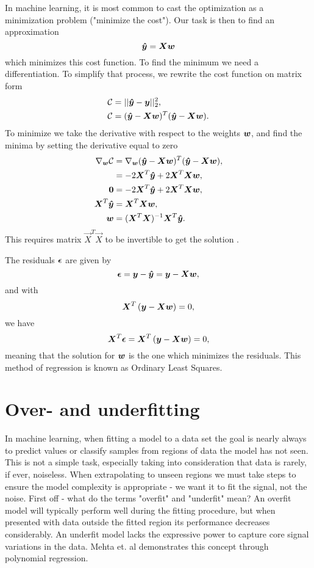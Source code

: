 In machine learning, it is most common to cast the optimization as a minimization problem
("minimize the cost"). Our task is then to find an approximation
\begin{equation}\label{eq:ols-approximation}
	{\boldsymbol{\hat{y}}} = {\boldsymbol{Xw}}
\end{equation}
which minimizes this cost function.
To find the minimum we need a differentiation. To simplify that process, we rewrite the cost function on matrix form
\begin{align*}
\mathcal{C} &= || {\boldsymbol{\hat{y}}} - {\boldsymbol{y}} ||_2 ^2, \\
\mathcal{C} &= ( {\boldsymbol{\hat{y}}} - {\boldsymbol{Xw}})^T( {\boldsymbol{\hat{y}}} - {\boldsymbol{Xw}}).
\end{align*}
To minimize we take the derivative with respect to the weights ${\boldsymbol{w}}$,
and find the minima by setting the derivative equal to zero
\begin{align}
\nabla _{{\boldsymbol{w}}}\mathcal{C} &= \nabla _{{\boldsymbol{w}}} ( {\boldsymbol{\hat{y}}} - {\boldsymbol{Xw}})^T( {\boldsymbol{\hat{y}}} - {\boldsymbol{Xw}}), \\
&= -2{\boldsymbol{X}}^T{\boldsymbol{\hat{y}}} + 2{\boldsymbol{X}}^T{\boldsymbol{X}}{\boldsymbol{w}}, \\
{\boldsymbol{0}} &= -2{\boldsymbol{X}}^T{\boldsymbol{\hat{y}}} + 2{\boldsymbol{X}}^T{\boldsymbol{X}}{\boldsymbol{w}}, \\
{\boldsymbol{X}}^T{\boldsymbol{\hat{y}}} &= {\boldsymbol{X}}^T{\boldsymbol{X}}{\boldsymbol{w}}, \\
{\boldsymbol{w}} &=({\boldsymbol{X}}^T{\boldsymbol{X}})^{-1} {\boldsymbol{X}}^T{\boldsymbol{\hat{y}}}. \label{eq:ols}
\end{align}
This requires matrix \(\vec{X}^T\vec{X}\) to be invertible to get the solution 
\cite{James2000}.

The residuals ${\boldsymbol{\epsilon}}$ are given by
$${\boldsymbol{\epsilon}} = {\boldsymbol{y}}-{\boldsymbol{\hat{y}}} = {\boldsymbol{y}}-{\boldsymbol{X}}{\boldsymbol{w}},$$
and with 
$${\boldsymbol{X}}^T\left( {\boldsymbol{y}}-{\boldsymbol{X}}{\boldsymbol{w}}\right)= 0,$$
we have
$${\boldsymbol{X}}^T{\boldsymbol{\epsilon}}={\boldsymbol{X}}^T\left( {\boldsymbol{y}}-{\boldsymbol{X}}{\boldsymbol{w}}\right)= 0,$$
meaning that the solution for ${\boldsymbol{w}}$ is the one which minimizes the residuals.
This method of regression is known as Ordinary Least Squares.

\section{Over- and underfitting}\label{sec:overfitting}
In machine learning, when fitting a model to a data set the goal is nearly always to predict 
values or classify samples from regions of data the model has not seen. This is not a simple task,
especially taking into consideration that data is rarely, if ever, noiseless. When extrapolating to 
unseen regions we must take steps to ensure the model complexity is appropriate - we want it to fit 
the signal, not the noise. First off - what do the terms "overfit" and "underfit" mean?
An overfit model will typically perform well during the fitting procedure, but when presented with
data outside the fitted region its performance decreases considerably.
An underfit model lacks the expressive power to capture core signal variations in the data.
Mehta et. al \cite{Mehta2019} demonstrates this concept through polynomial regression.

